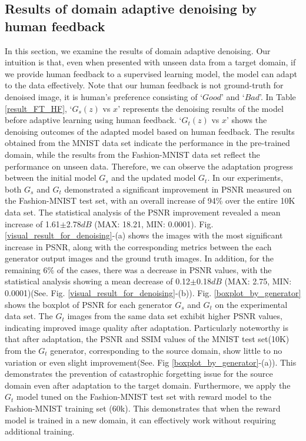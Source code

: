 \documentclass[lettersize,journal]{IEEEtran}
\begin{document}
\subsection{Results of domain adaptive denoising by human feedback}
 In this section, we examine the results of domain adaptive denoising. Our intuition is that, even when presented with unseen data from a target domain, if we provide human feedback to a supervised learning model, the model can adapt to the data effectively. Note that our human feedback is not ground-truth for denoised image, it is human's preference consisting of `$Good$' and `$Bad$'. In Table \ref{result_FT_HF}, `$G_s(z)$ vs $x$' represents the denoising results of the model before adaptive learning using human feedback. `$G_t(z)$ vs $x$' shows the denoising outcomes of the adapted model based on human feedback. The results obtained from the MNIST data set indicate the performance in the pre-trained domain, while the results from the Fashion-MNIST data set reflect the performance on unseen data. Therefore, we can observe the adaptation progress between the initial model $G_s$ and the updated model $G_t$. In our experiments, both $G_s$ and $G_t$ demonstrated a significant improvement in PSNR measured on the Fashion-MNIST test set, with an overall increase of 94\% over the entire 10K data set. The statistical analysis of the PSNR improvement revealed a mean increase of 1.61$\pm$2.78$dB$ (MAX: 18.21, MIN: 0.0001). Fig. \ref{visual_result_for_denoising}-(a) shows the images with the most significant increase in PSNR, along with the corresponding metrics between the each generator output images and the ground truth images. In addition, for the remaining 6\% of the cases, there was a decrease in PSNR values, with the statistical analysis showing a mean decrease of 0.12$\pm$0.18$dB$ (MAX: 2.75, MIN: 0.0001)(See. Fig. \ref{visual_result_for_denoising}-(b)). Fig. \ref{boxplot_by_generator} shows the boxplot of PSNR for each generator $G_s$ and $G_t$ on the experimental data set. The $G_t$ images from the same data set exhibit higher PSNR values, indicating improved image quality after adaptation. Particularly noteworthy is that after adaptation, the PSNR and SSIM values of the MNIST test set(10K) from the $G_t$ generator, corresponding to the source domain, show little to no variation or even slight improvement(See. Fig \ref{boxplot_by_generator}-(a)). This demonstrates the prevention of catastrophic forgetting issue for the source domain even after adaptation to the target domain. Furthermore, we apply the $G_t$ model tuned on the Fashion-MNIST test set with reward model to the Fashion-MNIST training set (60k). This demonstrates that when the reward model is trained in a new domain, it can effectively work without requiring additional training.\\
\end{document}
